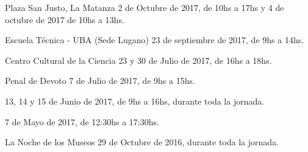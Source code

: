 \begin{enumerate}[leftmargin=0.8cm]
{\begin{itemize}[leftmargin=0.2cm]
{\begin{itemize}[leftmargin=0.2cm]
          {Plaza San Justo, La Matanza}
          {2 de Octubre de 2017, de 10hs a 17hs y 4 de octubre de 2017 de 10hs a 13hs.}

          {Escuela Técnica - UBA (Sede Lugano)}
          {23 de septiembre de 2017, de 9hs a 14hs.}

          {Centro Cultural de la Ciencia}
          {23 y 30 de Julio de 2017, de 16hs a 18hs.}

          {Penal de Devoto}
          {7 de Julio de 2017, de 9hs a 15hs.}

          {}{13, 14 y 15 de Junio de 2017, de 9hs a 16hs, durante toda la jornada.}

          {}{7 de Mayo de 2017, de 12:30hs a 17:30hs.}

          {La Noche de los Museos}
          {29 de Octubre de 2016, durante toda la jornada.}


\end{itemize}}
\end{itemize}}
\end{enumerate}
